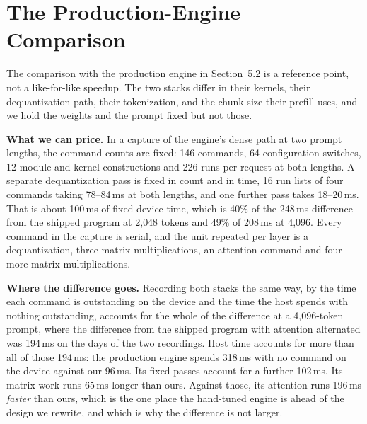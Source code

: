 \documentclass{article}
\newcommand{\ms}{\,ms}
\begin{document}
\section{The Production-Engine Comparison}
\label{app:flm}

The comparison with the production engine in Section~5.2 is a reference point, not a like-for-like speedup. The two
stacks differ in their kernels, their dequantization path, their tokenization, and the chunk size their prefill uses,
and we hold the weights and the prompt fixed but not those.

\textbf{What we can price.} In a capture of the engine's dense path at two prompt lengths, the command counts are
fixed: 146 commands, 64 configuration switches, 12 module and kernel constructions and 226 runs per request at both
lengths. A separate dequantization pass is fixed in count and in time, 16 run lists of four commands taking
78--84\ms{} at both lengths, and one further pass takes 18--20\ms. That is about 100\ms{} of fixed device time, which
is 40\% of the 248\ms{} difference from the shipped program at 2{,}048 tokens and 49\% of 208\ms{} at 4{,}096. Every command in the capture is
serial, and the unit repeated per layer is a dequantization, three matrix multiplications, an attention command and
four more matrix multiplications.

\textbf{Where the difference goes.} Recording both stacks the same way, by the time each command is outstanding on
the device and the time the host spends with nothing outstanding, accounts for the whole of the difference at a
4{,}096-token prompt, where the difference from the shipped program with attention alternated was 194\ms{} on the days of the two recordings. Host time accounts for more than all of those 194\ms{}: the production engine spends 318\ms{} with no command
on the device against our 96\ms. Its fixed passes account for a further 102\ms. Its matrix work runs 65\ms{} longer
than ours. Against those, its attention runs 196\ms{} \emph{faster} than ours, which is the one place the hand-tuned
engine is ahead of the design we rewrite, and which is why the difference is not larger.
\end{document}
